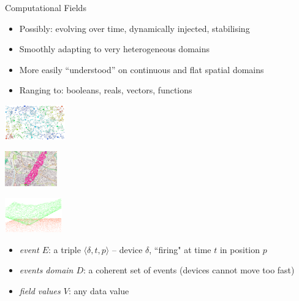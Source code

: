 \documentclass[8pt, aspectratio=169, handout]{beamer}
\begin{document}
\begin{frame}[allowframebreaks]{Computational Fields}
  \begin{card}
    \begin{itemize}
      \item Possibly: evolving over time, dynamically injected, stabilising
      \item Smoothly adapting to very heterogeneous domains
      \item More easily ``understood'' on continuous and flat spatial domains
      \item Ranging to: booleans, reals, vectors, functions
    \end{itemize}
    
  \end{card}
  \centering
  \begin{multicols}{3}
    \begin{card}
      \centering
      \includegraphics[height=15mm]{img/scr-result.png}
    \end{card}
    \begin{card}
      \centering
      \includegraphics[height=15mm]{img/channel.png}
    \end{card}
    \begin{card}
      \centering
      \includegraphics[height=15mm]{img/3d-gradient.png}
    \end{card}
  \end{multicols}
  \begin{card}
    \begin{itemize}
      \item \emph{event $E$}: a triple $\langle\delta, t, p\rangle$ – device $\delta$, ``firing" at time $t$ in position $p$
      \item \emph{events domain $D$}: a coherent set of events (devices cannot move too fast)
      \item \emph{field values $V$}: any data value
    \end{itemize}
  \end{card}
  \centering
  \begin{multicols}{2}
  \end{multicols}
\end{frame}
\end{document}
